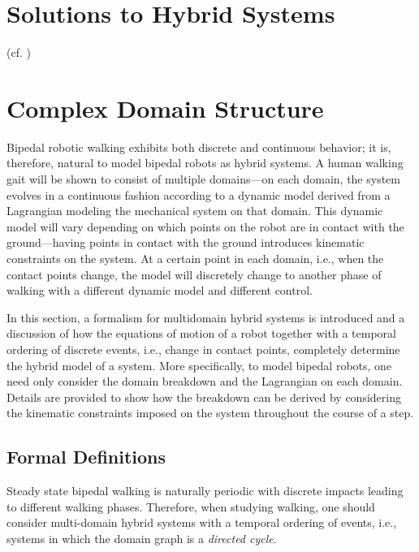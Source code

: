 \section{Solutions to Hybrid Systems}
(cf. \cite{YeMiHo98})

\section{Complex Domain Structure}
Bipedal robotic walking exhibits both discrete and continuous behavior; it is, therefore, natural to model bipedal robots as hybrid systems.
%
A human walking gait will be shown to consist of multiple domains---on each domain, the system evolves in a continuous fashion according to a dynamic model derived from a Lagrangian modeling the mechanical system on that domain.
%
This dynamic model will vary depending on which points on the robot are in contact with the ground---having points in contact with the ground introduces kinematic constraints on the system.
%
At a certain point in each domain, i.e., when the contact points change, the model will discretely change to another phase of walking with a different dynamic model and different control.
%

In this section, a formalism for multidomain hybrid systems is introduced and a discussion of how the equations of motion of a robot together with a temporal ordering of discrete events, i.e., change in contact points, completely determine the hybrid model of a system.
%
More specifically, to model bipedal robots, one need only consider the domain breakdown and the Lagrangian on each domain.
%
Details are provided to show how the breakdown can be derived by considering the kinematic constraints imposed on the system throughout the course of a step.


\subsection{Formal Definitions}

Steady state bipedal walking is naturally periodic with discrete impacts leading to different walking phases.
%
Therefore, when studying walking, one should consider multi-domain hybrid systems with a temporal ordering of events, i.e., systems in which the domain graph is a {\em directed cycle}.

